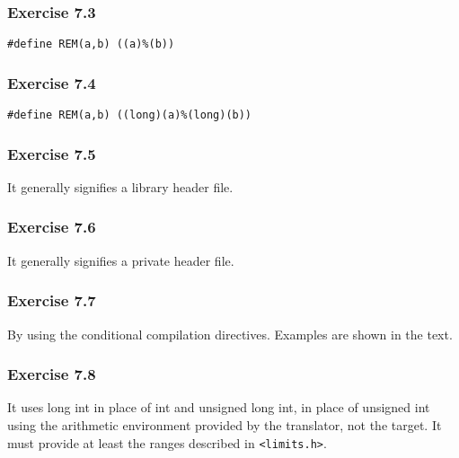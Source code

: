   

  \subsubsection*{Exercise 7.3}

   \begin{Verbatim}
#define REM(a,b) ((a)%(b))
\end{Verbatim}

  

  \subsubsection*{Exercise 7.4}

   \begin{Verbatim}
#define REM(a,b) ((long)(a)%(long)(b))
\end{Verbatim}

  

  \subsubsection*{Exercise 7.5}

   It generally signifies a library header file.


  

  \subsubsection*{Exercise 7.6}

   It generally signifies a private header file.


  

  \subsubsection*{Exercise 7.7}

   By using the conditional compilation directives. Examples are shown in
    the text.


  

  \subsubsection*{Exercise 7.8}

   It uses long int in place of int and unsigned long int, in place of
    unsigned int using the arithmetic environment provided by the translator,
    not the target. It must provide at least the ranges described in
    \texttt{<limits.h>}.


  

 

